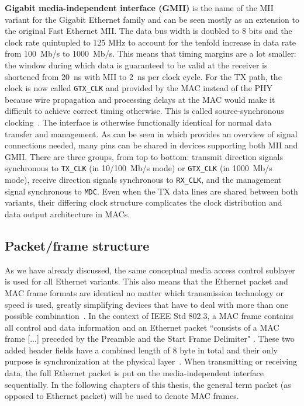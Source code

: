 \documentclass[a4paper, 11pt, oneside]{Thesis}  %
\begin{document}
\textbf{Gigabit media-independent interface (GMII)} is the name of the MII variant for the Gigabit Ethernet family and can be seen mostly as an extension to the original Fast Ethernet MII. The data bus width is doubled to 8 bits and the clock rate quintupled to 125 MHz to account for the tenfold increase in data rate from 100~Mb/s to 1000~Mb/s. This means that timing margins are a lot smaller: the window during which data is guaranteed to be valid at the receiver is shortened from 20~ns with MII to 2~ns per clock cycle. For the TX path, the clock is now called \texttt{GTX\_CLK} and provided by the MAC instead of the PHY because wire propagation and processing delays at the MAC would make it difficult to achieve correct timing otherwise. This is called source-synchronous clocking~\cite{AdvFPGA}. The interface is otherwise functionally identical for normal data transfer and management. As can be seen in  which provides an overview of signal connections needed, many pins can be shared in devices supporting both MII and GMII. There are three groups, from top to bottom: transmit direction signals synchronous to \texttt{TX\_CLK} (in 10/100~Mb/s mode) or \texttt{GTX\_CLK} (in 1000~Mb/s mode), receive direction signals synchronous to \texttt{RX\_CLK}, and the management signal synchronous to \texttt{MDC}. Even when the TX data lines are shared between both variants, their differing clock structure complicates the clock distribution and data output architecture in MACs.

\subsection{Packet/frame structure}\label{ch:eth_frames}

As we have already discussed, the same conceptual media access control sublayer is used for all Ethernet variants. This also means that the Ethernet packet and MAC frame formats are identical no matter which transmission technology or speed is used, greatly simplifying devices that have to deal with more than one possible combination~\cite{heiseEthernet}. In the context of IEEE Std 802.3, a MAC frame contains all control and data information and an Ethernet packet ``consists of a MAC frame [...] preceded by the Preamble and the Start Frame Delimiter" \cite[clause 1.4.299]{Ethernet}. These two added header fields have a combined length of 8 byte in total and their only purpose is synchronization at the physical layer~\cite{heiseEthernet}. When transmitting or receiving data, the full Ethernet packet is put on the media-independent interface sequentially. In the following chapters of this thesis, the general term packet (as opposed to Ethernet packet) will be used to denote MAC frames.
\end{document}
